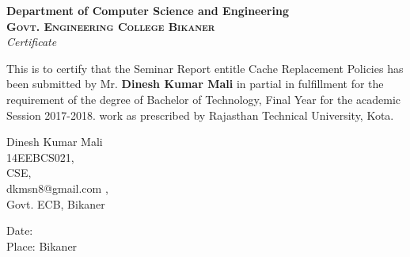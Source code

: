
\begin{center}

\huge{\textbf{Department of Computer Science and Engineering}}\\[0.5cm]
\normalsize
\textsc{\textbf{Govt. Engineering College Bikaner}}\\[2.0cm]

\emph{\LARGE Certificate}\\[2.5cm]
\end{center}
\normalsize This is to certify that the Seminar Report entitle Cache Replacement Policies has been submitted by Mr. \textbf{Dinesh Kumar Mali}  in partial in fulfillment for the requirement of the degree of Bachelor of Technology, Final Year for the academic Session 2017-2018.
work as prescribed by Rajasthan Technical University, Kota.
\\[1.0cm]



\vfill



       
        
\begin{flushleft}         
Dinesh Kumar Mali
\\14EEBCS021,
\\CSE,
\\dkmsn8@gmail.com ,
\\Govt. ECB, Bikaner
\end{flushleft}

\vspace{1cm}
\begin{flushleft}
Date:
\\Place: Bikaner
\end{flushleft}





